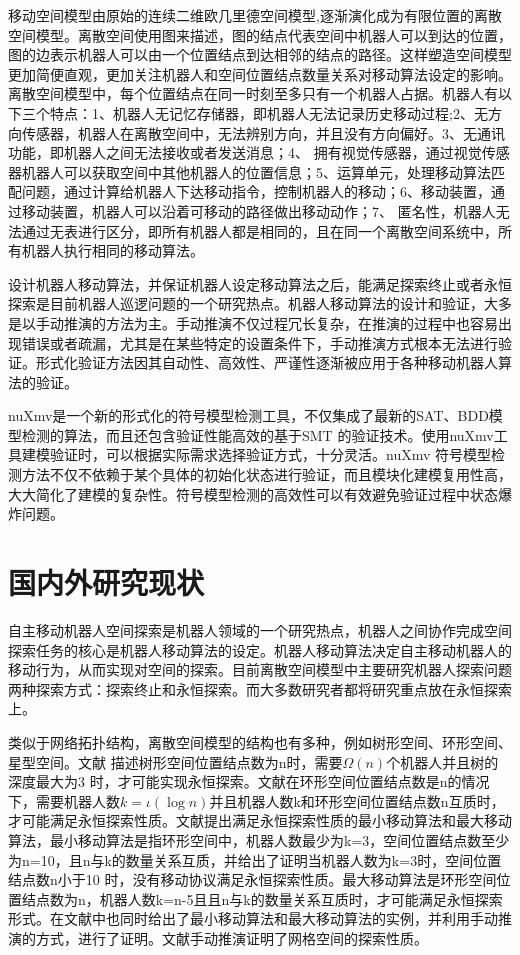 移动空间模型由原始的连续二维欧几里德空间模型,逐渐演化成为有限位置的离散空间模型。离散空间使用图来描述，图的结点代表空间中机器人可以到达的位置，图的边表示机器人可以由一个位置结点到达相邻的结点的路径。这样塑造空间模型更加简便直观，更加关注机器人和空间位置结点数量关系对移动算法设定的影响。离散空间模型中，每个位置结点在同一时刻至多只有一个机器人占据。机器人有以下三个特点：1、机器人无记忆存储器，即机器人无法记录历史移动过程;2、无方向传感器，机器人在离散空间中，无法辨别方向，并且没有方向偏好。3、无通讯功能，即机器人之间无法接收或者发送消息；4、 拥有视觉传感器，通过视觉传感器机器人可以获取空间中其他机器人的位置信息；5、运算单元，处理移动算法匹配问题，通过计算给机器人下达移动指令，控制机器人的移动；6、移动装置，通过移动装置，机器人可以沿着可移动的路径做出移动动作；7、 匿名性，机器人无法通过无表进行区分，即所有机器人都是相同的，且在同一个离散空间系统中，所有机器人执行相同的移动算法。

设计机器人移动算法，并保证机器人设定移动算法之后，能满足探索终止或者永恒探索是目前机器人巡逻问题的一个研究热点。机器人移动算法的设计和验证，大多是以手动推演的方法为主。手动推演不仅过程冗长复杂，在推演的过程中也容易出现错误或者疏漏，尤其是在某些特定的设置条件下，手动推演方式根本无法进行验证。形式化验证方法因其自动性、高效性、严谨性逐渐被应用于各种移动机器人算法的验证。

nuXmv是一个新的形式化的符号模型检测工具，不仅集成了最新的SAT、BDD模型检测的算法，而且还包含验证性能高效的基于SMT 的验证技术。使用nuXmv工具建模验证时，可以根据实际需求选择验证方式，十分灵活。nuXmv 符号模型检测方法不仅不依赖于某个具体的初始化状态进行验证，而且模块化建模复用性高，大大简化了建模的复杂性。符号模型检测的高效性可以有效避免验证过程中状态爆炸问题。

\section{国内外研究现状}
自主移动机器人空间探索\cite{r1}\cite{r2}是机器人领域的一个研究热点，机器人之间协作完成空间探索任务的核心是机器人移动算法\cite{r1}\cite{r3}\cite{r4}\cite{r5}的设定。机器人移动算法决定自主移动机器人的移动行为，从而实现对空间的探索。目前离散空间模型中主要研究机器人探索问题两种探索方式：探索终止\cite{r6}\cite{r7}\cite{r8}和永恒探索\cite{r9}。而大多数研究者都将研究重点放在永恒探索上。

类似于网络拓扑结构，离散空间模型的结构也有多种，例如树形空间、环形空间、星型空间。文献\cite{r8} 描述树形空间位置结点数为n时，需要$\Omega\left(n\right)$个机器人并且树的深度最大为3 时，才可能实现永恒探索。文献\cite{r7}在环形空间位置结点数是n的情况下，需要机器人数$k = \iota\left(\log n\right)$并且机器人数k和环形空间位置结点数n互质时，才可能满足永恒探索性质。文献\cite{r5}提出满足永恒探索性质的最小移动算法和最大移动算法，最小移动算法是指环形空间中，机器人数最少为k=3，空间位置结点数至少为n=10，且n与k的数量关系互质，并给出了证明当机器人数为k=3时，空间位置结点数n小于10 时，没有移动协议满足永恒探索性质。最大移动算法是环形空间位置结点数为n，机器人数k=n-5且且n与k的数量关系互质时，才可能满足永恒探索形式。在文献\cite{r5}中也同时给出了最小移动算法和最大移动算法的实例，并利用手动推演的方式，进行了证明。文献\cite{r10}\cite{r11}手动推演证明了网格空间的探索性质。

